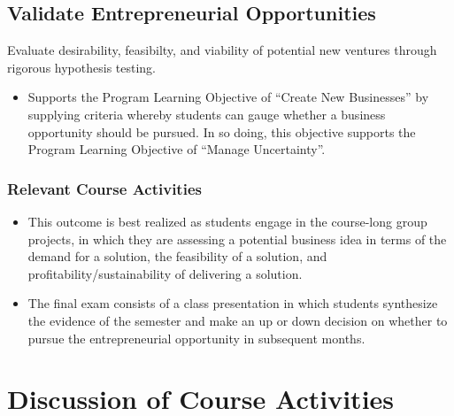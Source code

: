 \documentclass[11pt,article,oneside]{memoir}
\begin{document}
\subsection{Validate Entrepreneurial
Opportunities}\label{validate-entrepreneurial-opportunities}

Evaluate desirability, feasibilty, and viability of potential new
ventures through rigorous hypothesis testing.

\begin{itemize}
\tightlist
\item
  Supports the Program Learning Objective of \enquote{Create New
  Businesses} by supplying criteria whereby students can gauge whether a
  business opportunity should be pursued. In so doing, this objective
  supports the Program Learning Objective of \enquote{Manage
  Uncertainty}.
\end{itemize}

\subsubsection{Relevant Course
Activities}\label{relevant-course-activities-4}

\begin{itemize}
\tightlist
\item
  This outcome is best realized as students engage in the course-long
  group projects, in which they are assessing a potential business idea
  in terms of the demand for a solution, the feasibility of a solution,
  and profitability/sustainability of delivering a solution.
\item
  The final exam consists of a class presentation in which students
  synthesize the evidence of the semester and make an up or down
  decision on whether to pursue the entrepreneurial opportunity in
  subsequent months.
\end{itemize}

\section{Discussion of Course
Activities}\label{discussion-of-course-activities}
\end{document}
